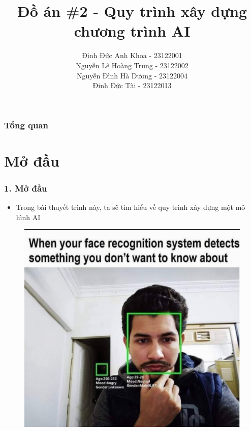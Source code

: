 \documentclass{beamer}
\title[Presentation ]{Đồ án \#2 - Quy trình xây dựng chương trình AI} %
\author{ Đinh Đức Anh Khoa - 23122001 \\ Nguyễn Lê Hoàng Trung - 23122002 \\ Nguyễn Đình Hà Dương - 23122004 \\ Đinh Đức Tài - 23122013
} %
\institute[23TNT1] %
{
FIT@HCMUS \\ %
\medskip
\textit{TPHCM, tháng 12 năm 2023} %
}
\date{} %
\begin{document}
\begin{frame}
\titlepage %
\end{frame}

\begin{frame}
\frametitle{Tổng quan} %
\tableofcontents %
\end{frame}

\section{Mở đầu} 
\begin{frame}
\frametitle{1. Mở đầu}
\begin{itemize}
\item Trong bài thuyết trình này, ta sẽ tìm hiểu về quy trình xây dựng một mô hình AI

\end{itemize}

\begin{figure}
    \centering
    \includegraphics[width=0.5\linewidth]{mem.png}
    
    
\end{figure}

\end{frame}
\end{document}
